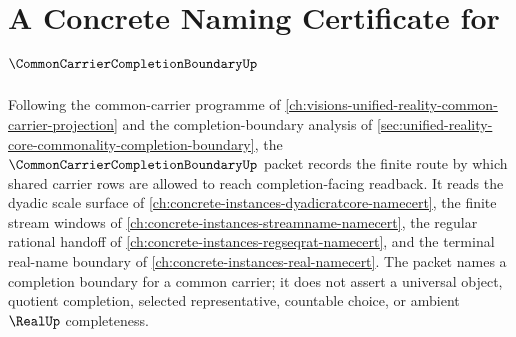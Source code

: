 \chapter{A Concrete Naming Certificate for $\CommonCarrierCompletionBoundaryUp$}
\label{ch:concrete-instances-common-carrier-completion-boundary-namecert}

Following the common-carrier programme of \autoref{ch:visions-unified-reality-common-carrier-projection} and the completion-boundary analysis of \autoref{sec:unified-reality-core-commonality-completion-boundary}, the $\CommonCarrierCompletionBoundaryUp$ packet records the finite route by which shared carrier rows are allowed to reach completion-facing readback. It reads the dyadic scale surface of \autoref{ch:concrete-instances-dyadicratcore-namecert}, the finite stream windows of \autoref{ch:concrete-instances-streamname-namecert}, the regular rational handoff of \autoref{ch:concrete-instances-regseqrat-namecert}, and the terminal real-name boundary of \autoref{ch:concrete-instances-real-namecert}. The packet names a completion boundary for a common carrier; it does not assert a universal object, quotient completion, selected representative, countable choice, or ambient $\RealUp$ completeness.

